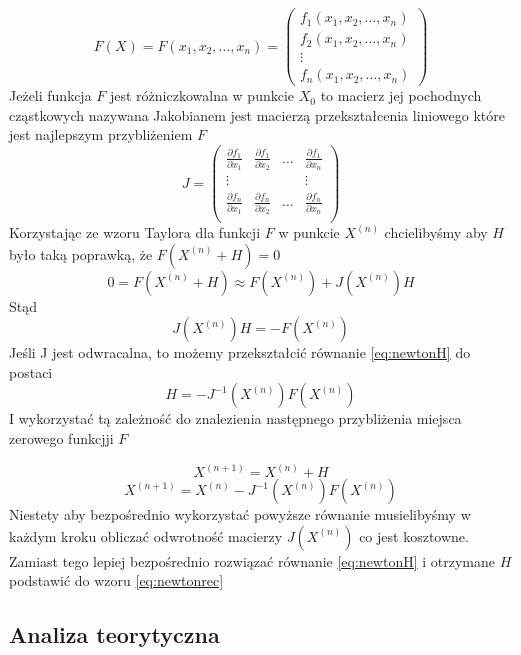 \documentclass[11pt,wide]{mwart}
\begin{document}
$$ 
F(X) = F(x_1, x_2, \ldots, x_n) = 
\left(\begin{matrix}
	f_1(x_1, x_2, \ldots, x_n) \\ 
	f_2(x_1, x_2, \ldots, x_n) \\ 
	\vdots\\ 
	f_n(x_1, x_2, \ldots, x_n)
\end{matrix}\right)
$$
Jeżeli funkcja $ F $ jest różniczkowalna w punkcie $ X_0 $ to macierz jej pochodnych cząstkowych nazywana Jakobianem jest macierzą przekształcenia liniowego które jest najlepszym przybliżeniem $ F $
$$ J = 
\begin{pmatrix}
\frac{\partial f_1}{\partial x_1} & \frac{\partial f_1}{\partial x_2} &  \ldots & \frac{\partial f_1}{\partial x_n} \\ 

 \vdots & & & \vdots  \\ 
\frac{\partial f_n}{\partial x_1} & \frac{\partial f_n}{\partial x_2} &  \ldots & \frac{\partial f_n}{\partial x_n} \\ 
\end{pmatrix}
$$
Korzystając ze wzoru Taylora dla funkcji $ F $ w punkcie $ X^{(n)} $ chcielibyśmy aby $ H$ było taką poprawką, że $ F(X^{(n)} + H) = 0 $
$$
 	0 = F(X^{(n)} + H) \approx F(X^{(n)}) + J(X^{(n)})H
$$
Stąd
\begin{equation} \label{eq:newtonH}
	J(X^{(n)})H = -F(X^{(n)})
\end{equation}
Jeśli J jest odwracalna, to możemy przekształcić równanie \eqref{eq:newtonH} do postaci
$$ 
	H = -J^{-1}(X^{(n)})F(X^{(n)}) 
$$
I wykorzystać tą zależność do znalezienia następnego przybliżenia miejsca zerowego funkcjji $ F $

\begin{equation} \label{eq:newtonrec}
	X^{(n + 1)} = X^{(n)} + H
\end{equation}
\begin{equation*}
	X^{(n + 1)} = X^{(n)} - J^{-1}(X^{(n)})F(X^{(n)})
\end{equation*}
Niestety aby bezpośrednio wykorzystać powyższe równanie musielibyśmy w każdym kroku  obliczać odwrotność macierzy $ J(X^{(n)}) $ co jest kosztowne. Zamiast tego lepiej bezpośrednio rozwiązać równanie \eqref{eq:newtonH} i otrzymane $ H $ podstawić do wzoru \eqref{eq:newtonrec}

\subsection{Analiza teorytyczna}
\end{document}

